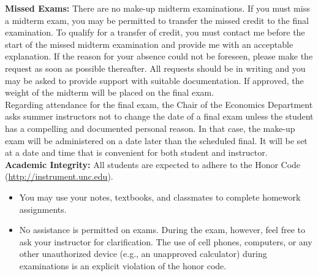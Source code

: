 \documentclass[11pt]{article}
\begin{document}
\newpage
\textbf{Missed Exams:} There are no make-up midterm examinations. If you must miss a midterm exam, you may be permitted to transfer the missed credit to the final examination. To qualify for a transfer of credit, you must contact me before the start of the missed midterm examination and provide me with an acceptable explanation. If the reason for your absence could not be foreseen, please make the request as soon as possible thereafter. All requests should be in writing and you may be asked to provide support with suitable documentation. If approved, the weight of the midterm will be placed on the final exam. \\

Regarding attendance for the final exam, the Chair of the Economics Department asks summer instructors not to change the date of a final exam unless the student has a compelling and documented personal reason.  In that case, the make-up exam will be administered on a date later than the scheduled final.  It will be set at a date and time that is convenient for both student and instructor.\\

\textbf{Academic Integrity:} All students are expected to adhere to the Honor Code  \\ (\url{http://instrument.unc.edu}). 
\begin{itemize}
	\item You may use your notes, textbooks, and classmates to complete homework assignments.
	\item No assistance is permitted on exams. During the exam, however, feel free to ask your instructor for clarification. The use of cell phones, computers, or any other unauthorized device (e.g., an unapproved calculator) during examinations is an explicit violation of the honor code.
\end{itemize}

\newpage
\end{document}

